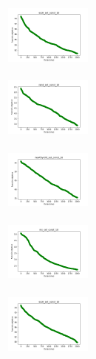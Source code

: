 \begin{figure}[H]
\begin{subfigure}
    \end{subfigure}
    \hfill
    \begin{subfigure}
        \centering
        \includegraphics[width=0.234\textwidth]{img/agesf/ecoli_set_const_10_589741062_cost.png}
    \end{subfigure}
    \hfill
    \begin{subfigure}
        \centering
        \includegraphics[width=0.234\textwidth]{img/agesf/rand_set_const_10_589741062_cost.png}
    \end{subfigure}
    \hfill
    \begin{subfigure}
        \centering
        \includegraphics[width=0.234\textwidth]{img/agesf/newthyroid_set_const_10_589741062_cost.png}
    \end{subfigure}
    \hfill
    \begin{subfigure}
        \centering
        \includegraphics[width=0.234\textwidth]{img/agesf/iris_set_const_10_277451237_cost.png}
    \end{subfigure}
    \hfill
    \begin{subfigure}
        \centering
        \includegraphics[width=0.234\textwidth]{img/agesf/ecoli_set_const_10_277451237_cost.png}
    \end{subfigure}
    \hfill

\end{figure}
